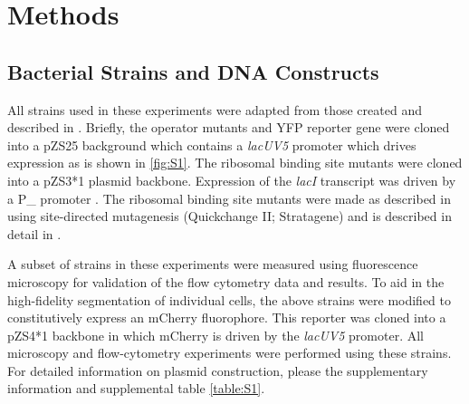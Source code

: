 \pagebreak
\section*{Methods }

\subsection{Bacterial Strains and DNA Constructs}
All strains used in these experiments were adapted from those created and
described in \citep{Garcia2011}. Briefly, the operator mutants and YFP reporter
gene were cloned into a pZS25 background which contains a \textit{lacUV5}
promoter which drives expression as is shown in \ref{fig:S1}. The ribosomal
binding site mutants were cloned into a pZS3*1 plasmid backbone. Expression of
the \textit{lacI} transcript was driven by a P_ promoter
\cite{Lutz1997}. The ribosomal binding site mutants were made as described in
\citep{Salis2009} using site-directed mutagenesis (Quickchange II; Stratagene)
and is described in detail in \citep{Garcia2011}.

A subset of strains in these experiments were measured using fluorescence
microscopy for validation of the flow cytometry data and results. To aid in the
high-fidelity segmentation of individual cells, the above strains were
modified to constitutively express an mCherry fluorophore. This reporter was
cloned into a pZS4*1 backbone in which mCherry is driven by the \textit{lacUV5} promoter.
All microscopy and flow-cytometry experiments were performed using these
strains. For detailed information on plasmid construction, please the
supplementary information and supplemental table \ref{table:S1}.


